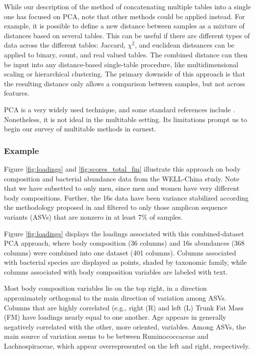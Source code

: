 \documentclass{article}
\begin{document}
While our description of the method of concatenating multiple tables into a
single one has focused on PCA, note that other methods could be applied instead.
For example, it is possible to define a new distance between samples as a
mixture of distances based on several tables. This can be useful if there are
different types of data across the different tables: Jaccard, $\chi^{2}$, and
euclidean distsances can be applied to binary, count, and real valued tables.
The combined distance can then be input into any distance-based single-table
procedure, like multidimensional scaling or hierarchical clustering. The primary
downside of this approach is that the resulting distance only allows a
comparison between samples, but not across features.

PCA is a very widely used technique, and some standard references include
\citep{friedman2001elements, mardia1980multivariate, pages2014multiple}.
Nonetheless, it is not ideal in the multitable setting. Its limitations prompt
us to begin our survey of multitable methods in earnest.

\subsubsection{Example}
\label{subsubsec:pca_example}

Figure \ref{fig:loadings} and \ref{fig:scores_total_fm} illustrate this approach
on body composition and bacterial abundance data from the WELL-China study.
Note that we have subsetted to only men, since men and women have very different
body compositions. Further, the 16s data have been variance stabilized according
the methodology proposed in \citep{Anders2010} and filtered to only those
amplicon sequence variants (ASVs) that are nonzero in at least 7\% of samples.

Figure \ref{fig:loadings} displays the loadings associated with this
combined-dataset PCA approach, where body composition (36 columns) and 16s
abundances (368 columns) were combined into one dataset (401 columns). Columns
associated with bacterial species are displayed as points, shaded by taxonomic
family, while columns associated with body composition variables are labeled
with text.

Most body composition variables lie on the top right, in a direction
approximately orthogonal to the main direction of variation among ASVs. Columns
that are highly correlated (e.g., right (R) and left (L) Trunk Fat Mass (FM)
have loadings nearly equal to one another. Age appears in generally negatively
correlated with the other, more  oriented, variables. Among ASVs, the main
source of variation seems to be between Ruminococcaceae and Lachnospiraceae,
which appear overrepresented on the left and right, respectively.
\end{document}
